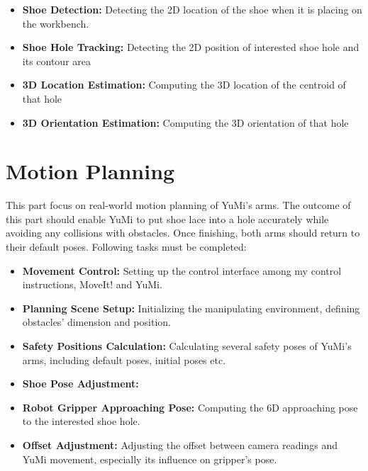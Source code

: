 \begin{itemize}
    \item \textbf{Shoe Detection:} Detecting the 2D location of the shoe when it is placing on the workbench.
    \item \textbf{Shoe Hole Tracking:} Detecting the 2D position of interested shoe hole and its contour area
    \item \textbf{3D Location Estimation:} Computing the 3D location of the centroid of that hole
    \item \textbf{3D Orientation Estimation:} Computing the 3D orientation of that hole
\end{itemize}


\section{Motion Planning}
This part focus on real-world motion planning of YuMi's arms. The outcome of this part should enable YuMi to put shoe lace into a hole accurately while avoiding any collisions with obstacles. Once finishing, both arms should return to their default poses. Following tasks must be completed:

\begin{itemize}
    \item \textbf{Movement Control:} Setting up the control interface among my control instructions, MoveIt! and YuMi.
    \item \textbf{Planning Scene Setup:} Initializing the manipulating environment, defining obstacles' dimension and position.
    \item \textbf{Safety Positions Calculation:} Calculating several safety poses of YuMi's arms, including default poses, initial poses etc.
    \item \textbf{Shoe Pose Adjustment:}
    \item \textbf{Robot Gripper Approaching Pose:} Computing the 6D approaching pose to the interested shoe hole.
    \item \textbf{Offset Adjustment:} Adjusting the offset between camera readings and YuMi movement, especially its influence on gripper's pose.
\end{itemize}



